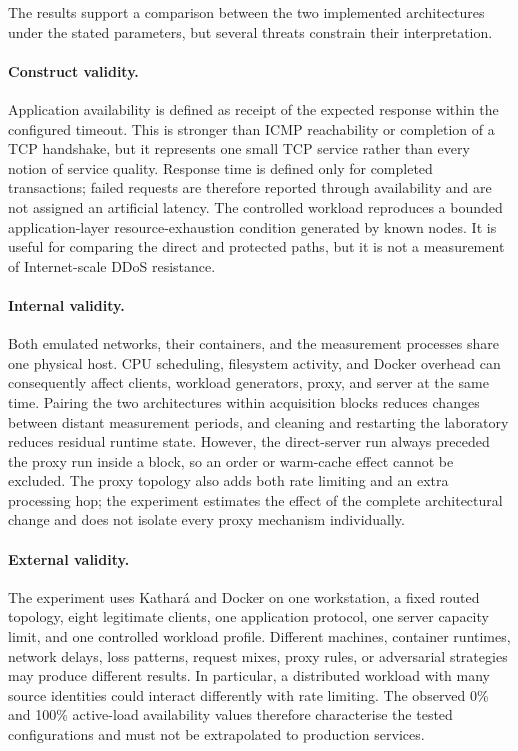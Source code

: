 The results support a comparison between the two implemented architectures
under the stated parameters, but several threats constrain their
interpretation.

\paragraph{Construct validity.}
Application availability is defined as receipt of the expected response within
the configured timeout. This is stronger than ICMP reachability or completion
of a TCP handshake, but it represents one small TCP service rather than every
notion of service quality. Response time is defined only for completed
transactions; failed requests are therefore reported through availability and
are not assigned an artificial latency. The controlled workload reproduces a
bounded application-layer resource-exhaustion condition generated by known
nodes. It is useful for comparing the direct and protected paths, but it is not
a measurement of Internet-scale DDoS resistance.

\paragraph{Internal validity.}
Both emulated networks, their containers, and the measurement processes share
one physical host. CPU scheduling, filesystem activity, and Docker overhead
can consequently affect clients, workload generators, proxy, and server at the
same time. Pairing the two architectures within acquisition blocks reduces
changes between distant measurement periods, and cleaning and restarting the
laboratory reduces residual runtime state. However, the direct-server run
always preceded the proxy run inside a block, so an order or warm-cache effect
cannot be excluded. The proxy topology also adds both rate limiting and an
extra processing hop; the experiment estimates the effect of the complete
architectural change and does not isolate every proxy mechanism individually.

\paragraph{External validity.}
The experiment uses Kathar\'a and Docker on one workstation, a fixed routed
topology, eight legitimate clients, one application protocol, one server
capacity limit, and one controlled workload profile. Different machines,
container runtimes, network delays, loss patterns, request mixes, proxy rules,
or adversarial strategies may produce different results. In particular, a
distributed workload with many source identities could interact differently
with rate limiting. The observed 0\% and 100\% active-load availability values
therefore characterise the tested configurations and must not be extrapolated
to production services.

